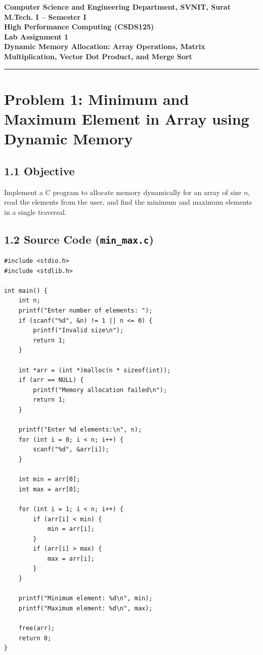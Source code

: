 \documentclass[12pt]{article}
\begin{document}

\begin{center}
\textbf{Computer Science and Engineering Department, SVNIT, Surat}\\
\textbf{M.Tech. I -- Semester I}\\
\textbf{High Performance Computing (CSDS125)}\\
\textbf{Lab Assignment 1}\\
\textbf{Dynamic Memory Allocation: Array Operations, Matrix Multiplication, Vector Dot Product, and Merge Sort}
\end{center}
\vspace{-4pt}
\hrule
\vspace{8pt}

\section*{Problem 1: Minimum and Maximum Element in Array using Dynamic Memory}

\subsection*{1.1 Objective}
Implement a C program to allocate memory dynamically for an array of size $n$, read the elements from the user, and find the minimum and maximum elements in a single traversal.

\subsection*{1.2 Source Code (\texttt{min\_max.c})}
\begin{lstlisting}[style=code]
#include <stdio.h>
#include <stdlib.h>

int main() {
    int n;
    printf("Enter number of elements: ");
    if (scanf("%d", &n) != 1 || n <= 0) {
        printf("Invalid size\n");
        return 1;
    }

    int *arr = (int *)malloc(n * sizeof(int));
    if (arr == NULL) {
        printf("Memory allocation failed\n");
        return 1;
    }

    printf("Enter %d elements:\n", n);
    for (int i = 0; i < n; i++) {
        scanf("%d", &arr[i]);
    }

    int min = arr[0];
    int max = arr[0];

    for (int i = 1; i < n; i++) {
        if (arr[i] < min) {
            min = arr[i];
        }
        if (arr[i] > max) {
            max = arr[i];
        }
    }

    printf("Minimum element: %d\n", min);
    printf("Maximum element: %d\n", max);

    free(arr);
    return 0;
}
\end{lstlisting}
\end{document}

